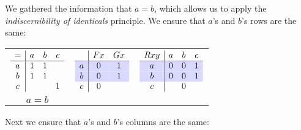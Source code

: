\documentclass[PHIL101-Textbook.tex]{subfiles}
\begin{document}
\noindent We gathered the information that $a=b$, which allows us to apply the \emph{indiscernibility of identicals} principle. We ensure that $a$'s and $b$'s rows are the same:

\begin{center}
  \begin{tabular}{ccc}
	$\begin{array}{c|ccc}
	   = & a & b & c\\ \hline
	   a & 1 & 1 &\\
	   b & 1 & 1 &\\
	   c & & & 1
	 \end{array}$
	 &
   $\begin{array}{c|cc}
	  & \atom F x & \atom G x\\ \hline
	  \cellcolor{blue!15} a & \cellcolor{blue!15}\vF & \cellcolor{blue!15}\vT \\
	  \cellcolor{blue!15} b & \cellcolor{blue!15}\vF & \cellcolor{blue!15}\vT \\
	  c & \vF &
	\end{array}$
	 &
   $\begin{array}{c|ccc}
	  \atom R {xy} & a & b & c\\ \hline
	  \cellcolor{blue!15} a & \cellcolor{blue!15} \vF & \cellcolor{blue!15}\vF & \cellcolor{blue!15}\vT \\
	  \cellcolor{blue!15} b & \cellcolor{blue!15} \vF & \cellcolor{blue!15}\vF & \cellcolor{blue!15}\vT \\
	  c & & \vF & 
	\end{array}$\\
	$a=b$
  \end{tabular}
\end{center}

\noindent Next we ensure that $a$'s and $b$'s columns are the same:
\end{document}
